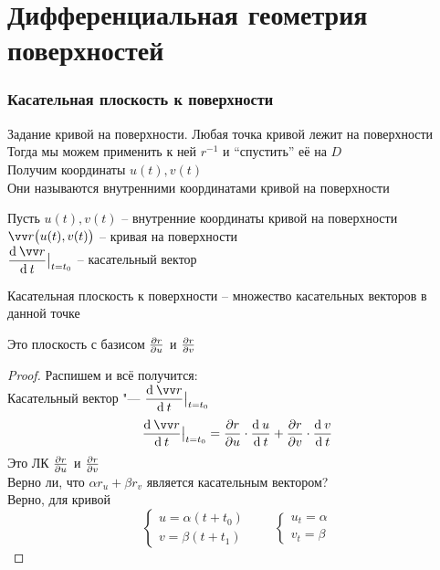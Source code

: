 \part{Дифференциальная геометрия поверхностей}

\section{Касательная плоскость к поверхности}

\begin{undefthm}{Задание кривой на поверхности.}
	Любая точка кривой лежит на поверхности \\
	Тогда мы можем применить к ней $ r^{-1} $ и ``спустить'' её на $ D $ \\
	Получим координаты $ u(t), v(t) $ \\
	Они называются внутренними координатами кривой на поверхности
\end{undefthm}

\begin{definition}
	Пусть $ u(t), v(t) $ -- внутренние координаты кривой на поверхности \\
	$ \vv r \big( u(t), v(t) \big) $ -- кривая на поверхности \\
	$ \dfrac{\di \vv r}{\di t}\clamp{t = t_0} $ -- касательный вектор
\end{definition}

\begin{definition}
	Касательная плоскость к поверхности -- множество касательных векторов в данной точке
\end{definition}

\begin{statement}
	Это плоскость с базисом $ \frac{\partial {r}}{\partial {u}} $ и $ \frac{\partial {r}}{\partial {v}} $
\end{statement}

\begin{proof}
	Распишем и всё получится: \\
	Касательный вектор "--- $ \dfrac{\di \vv r}{\di t}\clamp{t = t_0} $
	$$ \frac{\di \vv r}{\di t}\clamp{t = t_0} = \pder ru \cdot \frac{\di u}{\di t} + \pder rv \cdot \frac{\di v}{\di t} $$
	Это ЛК $ \frac{\partial {r}}{\partial {u}} $ и $ \frac{\partial {r}}{\partial {v}} $ \\
	Верно ли, что $ \alpha r_u + \beta r_v $ является касательным вектором? \\
	Верно, для кривой
	$$
	\begin{cases}
		u = \alpha(t + t_0) \\
		v = \beta(t + t_1)
	\end{cases} \qquad
	\begin{cases}
		u_t = \alpha \\
		v_t = \beta
	\end{cases} $$
\end{proof}

